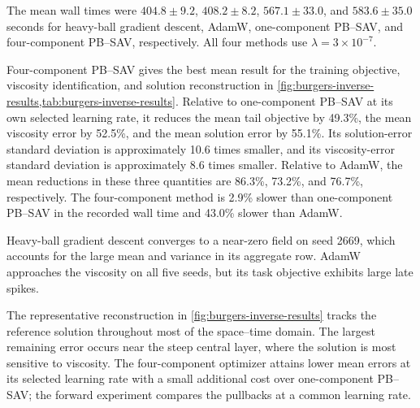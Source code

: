 The mean wall times were \(404.8\pm9.2\), \(408.2\pm8.2\),
\(567.1\pm33.0\), and \(583.6\pm35.0\) seconds for heavy-ball gradient
descent, AdamW, one-component PB--SAV, and four-component PB--SAV,
respectively.  All four methods use \(\lambda=3\times10^{-7}\).

Four-component PB--SAV gives the best mean result for the training objective,
viscosity identification, and solution reconstruction in
\cref{fig:burgers-inverse-results,tab:burgers-inverse-results}.  Relative to
one-component PB--SAV at its own selected learning rate, it reduces the mean
tail objective by 49.3\%, the mean viscosity error by 52.5\%, and the mean
solution error by 55.1\%.  Its solution-error standard deviation is
approximately 10.6 times smaller, and its viscosity-error standard deviation
is approximately 8.6 times smaller.
Relative to AdamW, the mean reductions in these three quantities are 86.3\%,
73.2\%, and 76.7\%, respectively.  The four-component method is 2.9\% slower
than one-component PB--SAV in the recorded wall time and 43.0\% slower than
AdamW.

Heavy-ball gradient descent converges to a near-zero field on seed 2669,
which accounts for the large mean and variance in its aggregate row.  AdamW
approaches the viscosity on all five seeds, but its task objective exhibits
large late spikes.

The representative reconstruction in \cref{fig:burgers-inverse-results}
tracks the reference solution throughout most of the space--time domain.  The
largest remaining error occurs near the steep central layer, where the
solution is most sensitive to viscosity. The four-component optimizer attains
lower mean errors at its selected learning rate with a small additional cost
over one-component PB--SAV; the forward experiment compares the pullbacks at a
common learning rate.

\FloatBarrier
